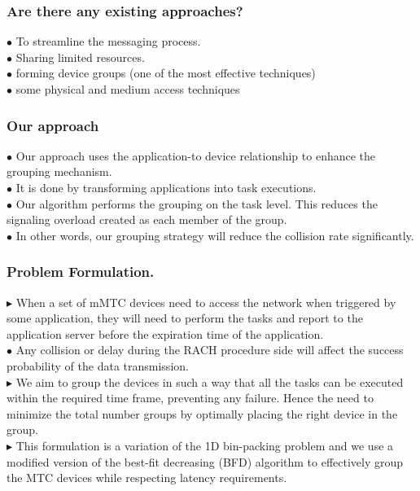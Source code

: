 \documentclass{beamer}
\begin{document}
\begin{frame}
\frametitle{Are there any existing approaches?}

$\bullet$ To streamline the messaging process.\\
$\bullet$ Sharing limited resources.\\
$\bullet$ forming device groups (one of the most effective techniques)\\
$\bullet$ some physical and medium access techniques\\ 

\end{frame}


\begin{frame}
\frametitle{Our approach}
$\bullet$ Our approach uses the application-to device relationship to enhance the grouping mechanism.\\
$\bullet$ It is done by transforming applications into task executions.\\
$\bullet$ Our algorithm performs the grouping on the task level. This reduces the signaling overload created as each member of the group.\\
$\bullet$ In other words, our grouping strategy will reduce the collision rate significantly.\\

\end{frame}



\begin{frame}
\frametitle{Problem Formulation.}
$\blacktriangleright$ When a set of mMTC devices need to access the network when triggered by some application, they will need to perform the tasks and report to the application server before the expiration time of the application.\\
$\bullet$ Any collision or delay during the RACH procedure side will affect the success probability of the data transmission.\\
$\blacktriangleright$ We aim to group the devices in such a way that all the tasks can be executed within the required time frame, preventing any failure. Hence the need to minimize the total number groups by optimally placing the right device in the group.\\
$\blacktriangleright$ This formulation is a variation of the 1D bin-packing problem and we use a modified version of the best-fit decreasing (BFD) algorithm to effectively group the MTC devices while respecting latency requirements.\\
\end{frame}
\end{document}
